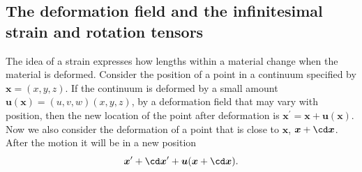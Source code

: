 \documentclass[a4paper,11pt]		{report}
\begin{document}
\subsection{The deformation field and the infinitesimal strain and
  rotation tensors}

The idea of a strain expresses how lengths within a material change
when the material is deformed. Consider the position of a point in a
continuum specified by $\bm{x}=(x, y, z)$. If the continuum is
deformed by a small amount $\bm{u}(\bm{x})=(u, v, w)(x, y, z)$, \ie by
a deformation field that may vary with position, then the new location
of the point after deformation is
$\bm{x}^\prime=\bm{x}+\bm{u}(\bm{x})$. Now we also consider the
deformation of a point that is close to $\bm{x}$, \ie
$\bm{x}+\cd\bm{x}$. After the motion it will be in a new position
\[
\bm{x}^\prime + \cd\bm{x}^\prime + \bm{u}(\bm{x}+\cd\bm{x}).
\]
\end{document}
